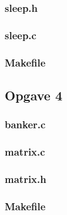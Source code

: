 \subsubsection*{sleep.h}

\subsubsection*{sleep.c}

\subsubsection*{Makefile}


\subsection*{Opgave 4}
\subsubsection*{banker.c}

\subsubsection*{matrix.c}

\subsubsection*{matrix.h}


\subsubsection*{Makefile}


